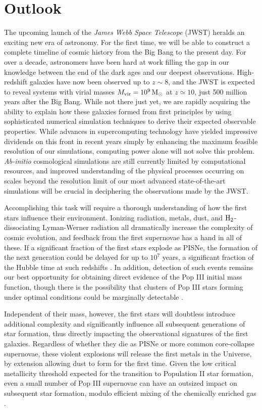 \documentclass[../thesis.tex]{subfiles}
\begin{document}
\chapter{Outlook}
The upcoming launch of the \textit{James Webb Space Telescope} (JWST) heralds an exciting new era of astronomy. 
For the first time, we will be able to construct a complete timeline of cosmic history from the Big Bang to the present day.
For over a decade, astronomers have been hard at work filling the gap in our knowledge between the end of the dark ages and our deepest observations.
High-redshift galaxies have now been observed up to $z\sim8$, and the JWST is expected to reveal systems with virial masses $M_{\mathrm{vir}} = 10^9\,\mathrm{M}_{\odot}$ at $z\simeq10$, just 500 million years after the Big Bang.
While not there just yet, we are rapidly acquiring the ability to explain how these galaxies formed from first principles by using sophisticated numerical simulation techniques to derive their expected observable properties.
While advances in supercomputing technology have yielded impressive dividends on this front in recent years simply by enhancing the maximum feasible resolution of our simulations, computing power alone will not solve this problem.
\textit{Ab-initio} cosmological simulations are still currently limited by computational resources, and improved understanding of the physical processes occurring on scales beyond the resolution limit of our most advanced state-of-the-art simulations will be crucial in deciphering the observations made by the JWST.

Accomplishing this task will require a thorough understanding of how the first stars influence their environment.
Ionizing radiation, metals, dust, and $\mathrm{H}_2$-dissociating Lyman-Werner radiation all dramatically increase the complexity of cosmic evolution, and feedback from the first supernovae has a hand in all of these.
If a significant fraction of the first stars explode as PISNe, the formation of the next generation could be delayed for up to $10^7$ years, a significant fraction of the Hubble time at such redshifts \citep{JohnsonGreifBromm2007, Yoshidaetal2007, Whalenetal2008}.
In addition, detection of such events remains our best opportunity for obtaining direct evidence of the Pop III initial mass function, though there is the possibility that clusters of Pop III stars forming under optimal conditions could be marginally detectable \citep{Safranek-Shraderetal2012}.

Independent of their mass, however, the first stars will doubtless introduce additional complexity and significantly influence all subsequent generations of star formation, thus directly impacting the observational signatures of the first galaxies.
Regardless of whether they die as PISNe or more common core-collapse supernovae, these violent explosions will release the first metals in the Universe, by extension allowing dust to form for the first time.  
Given the low critical metallicity threshold expected for the transition to Population II star formation, even a small number of Pop III supernovae can have an outsized impact on subsequent star formation, modulo efficient mixing of the chemically enriched gas \citep{Ritteretal2012}.
\end{document}
